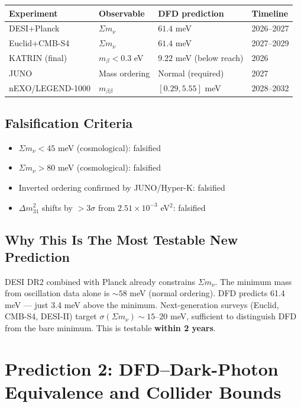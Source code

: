 \documentclass[11pt]{article}
\begin{document}
\begin{center}
\begin{tabular}{llll}
\toprule
Experiment & Observable & DFD prediction & Timeline \\
\midrule
DESI+Planck & $\Sigma m_\nu$ & $61.4$ meV & 2026--2027 \\
Euclid+CMB-S4 & $\Sigma m_\nu$ & $61.4$ meV & 2027--2029 \\
KATRIN (final) & $m_\beta < 0.3$ eV & $9.22$ meV (below reach) & 2026 \\
JUNO & Mass ordering & Normal (required) & 2027 \\
nEXO/LEGEND-1000 & $m_{\beta\beta}$ & $[0.29, 5.55]$ meV & 2028--2032 \\
\bottomrule
\end{tabular}
\end{center}

\subsection{Falsification Criteria}

\begin{itemize}
\item $\Sigma m_\nu < 45$ meV (cosmological): falsified
\item $\Sigma m_\nu > 80$ meV (cosmological): falsified
\item Inverted ordering confirmed by JUNO/Hyper-K: falsified
\item $\Delta m^2_{31}$ shifts by $> 3\sigma$ from $2.51 \times 10^{-3}$ eV$^2$: falsified
\end{itemize}

\subsection{Why This Is The Most Testable New Prediction}

DESI DR2 combined with Planck already constrains $\Sigma m_\nu$. The minimum mass from oscillation data alone is $\sim 58$ meV (normal ordering). DFD predicts 61.4 meV --- just 3.4 meV above the minimum. Next-generation surveys (Euclid, CMB-S4, DESI-II) target $\sigma(\Sigma m_\nu) \sim 15$--$20$ meV, sufficient to distinguish DFD from the bare minimum. This is testable \textbf{within 2 years}.

\section{Prediction 2: DFD--Dark-Photon Equivalence and Collider Bounds}
\label{sec:dark-photon}
\end{document}
